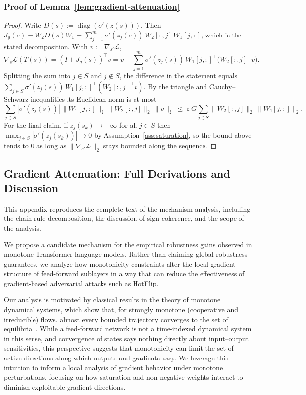 \documentclass{article}
\theoremstyle{plain}
\theoremstyle{definition}
\theoremstyle{remark}
\theoremstyle{plain}
\begin{document}
\subsubsection{Proof of Lemma~\ref{lem:gradient-attenuation}}
\label{prf:atten}
\begin{proof}
Write $D(s) := \operatorname{diag}(\sigma'(z(s)))$. Then
$J_g(s) = W_2 D(s) W_1 = \sum_{j=1}^m \sigma'(z_j(s))\, W_2[:,j]\, W_1[j,:]$, which is
the stated decomposition. With $v := \nabla_{s'}\mathcal{L}$,
\[
\nabla_s \mathcal{L}(T(s)) = (I + J_g(s))^\top v
= v + \sum_{j=1}^m \sigma'(z_j(s))\, W_1[j,:]^\top \bigl(W_2[:,j]^\top v\bigr).
\]
Splitting the sum into $j \in S$ and $j \notin S$, the difference in the statement
equals $\sum_{j\in S} \sigma'(z_j(s))\, W_1[j,:]^\top (W_2[:,j]^\top v)$. By the
triangle and Cauchy--Schwarz inequalities its Euclidean norm is at most
\[
\sum_{j\in S} |\sigma'(z_j(s))|\, \|W_1[j,:]\|_2\, \|W_2[:,j]\|_2\, \|v\|_2
\;\le\; \varepsilon\, G \sum_{j\in S} \|W_2[:,j]\|_2\, \|W_1[j,:]\|_2 .
\]
For the final claim, if $z_j(s_k) \to -\infty$ for all $j \in S$ then
$\max_{j\in S}|\sigma'(z_j(s_k))| \to 0$ by Assumption~\ref{ass:saturation}, so
the bound above tends to $0$ as long as $\|\nabla_{s'}\mathcal{L}\|_2$ stays bounded
along the sequence.
\end{proof}



\subsection{Gradient Attenuation: Full Derivations and Discussion}
\label{app:mechanism-details}
This appendix reproduces the complete text of the mechanism analysis, including the chain-rule decomposition, the discussion of sign coherence, and the scope of the analysis.

We propose a candidate mechanism for the empirical robustness gains observed in monotone Transformer language models.
Rather than claiming global robustness guarantees, we analyze how monotonicity constraints alter the local gradient structure of feed-forward sublayers in a way that can reduce the effectiveness of gradient-based adversarial attacks such as HotFlip.

Our analysis is motivated by classical results in the theory of monotone dynamical systems, which show that, for strongly monotone (cooperative and irreducible) flows, almost every bounded trajectory converges to the set of equilibria~\citep{hirsch1985systems}.
While a feed-forward network is not a time-indexed dynamical system in this sense, and convergence of states says nothing directly about input--output sensitivities, this perspective suggests that monotonicity can limit the set of active directions along which outputs and gradients vary. We leverage this intuition to inform a local analysis of gradient behavior under monotone perturbations, focusing on how saturation and non-negative weights interact to diminish exploitable gradient directions.
\end{document}
